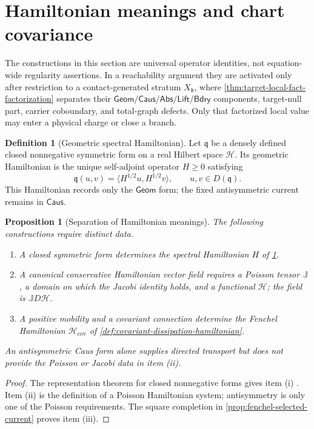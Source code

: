 \documentclass[11pt]{article}
\numberwithin{section}{part}
\theoremstyle{plain}
\newtheorem{proposition}[proposition]{Proposition}
\theoremstyle{definition}
\newtheorem{definition}[definition]{Definition}
\theoremstyle{remark}
\newcommand{\Geom}{\mathsf{Geom}}
\newcommand{\Caus}{\mathsf{Caus}}
\newcommand{\Abs}{\mathsf{Abs}}
\newcommand{\Lift}{\mathsf{Lift}}
\newcommand{\Bdry}{\mathsf{Bdry}}
\newcommand{\Hspace}{\mathcal H}
\begin{document}
\section{Hamiltonian meanings and chart covariance}
\label{sec:hamiltonian-meanings}

The constructions in this section are universal operator identities, not
equation-wide regularity assertions.  In a reachability argument they are
activated only after restriction to a contact-generated stratum
\(X_{\mathfrak b}\), where
\cref{thm:target-local-fact-factorization} separates their
\(\Geom/\Caus/\Abs/\Lift/\Bdry\) components, target-null part, carrier
coboundary, and total-graph defects.  Only that factorized local value may
enter a physical charge or close a branch.

\begin{definition}[Geometric spectral Hamiltonian]
\label{def:geometric-hamiltonian}
Let \(\mathfrak q\) be a densely defined closed nonnegative symmetric form on
a real Hilbert space \(\Hspace\).  Its geometric Hamiltonian is the unique
self-adjoint operator \(H\ge0\) satisfying
\[
 \mathfrak q(u,v)=\langle H^{1/2}u,H^{1/2}v\rangle,
 \qquad u,v\in D(\mathfrak q).
\]
This Hamiltonian records only the \(\Geom\) form; the fixed antisymmetric
current remains in \(\Caus\).
\end{definition}

\begin{proposition}[Separation of Hamiltonian meanings]
\label{prop:hamiltonian-separation}
The following constructions require distinct data.
\begin{enumerate}[label=\textup{(\roman*)}]
\item A closed symmetric form determines the spectral Hamiltonian \(H\) of
\cref{def:geometric-hamiltonian}.
\item A canonical conservative Hamiltonian vector field requires a Poisson
tensor \(\mathbb J\), a domain on which the Jacobi identity holds, and a
functional \(\mathcal H\); the field is \(\mathbb J D\mathcal H\).
\item A positive mobility and a covariant connection determine the Fenchel
Hamiltonian \(\mathscr H_{\mathrm{cov}}\) of
\cref{def:covariant-dissipation-hamiltonian}.
\end{enumerate}
An antisymmetric Caus form alone supplies directed transport but does not
provide the Poisson or Jacobi data in item \textup{(ii)}.
\end{proposition}

\begin{proof}
The representation theorem for closed nonnegative forms gives item
\textup{(i)} \citep[Chapter~VI]{Kato1995}.  Item \textup{(ii)} is the
definition of a Poisson Hamiltonian system; antisymmetry is only one of the
Poisson requirements.  The square completion in
\cref{prop:fenchel-selected-current} proves item \textup{(iii)}.
\end{proof}
\end{document}
